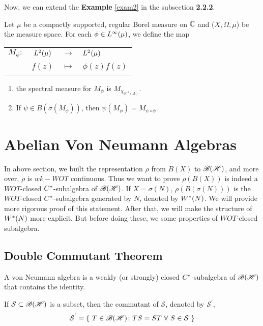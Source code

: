 \documentclass[a4paper,11pt]{report}
\begin{document}
Now, we can extend the \textbf{Example} \ref{exam2} in the subsection \textbf{2.2.2}.

\begin{exam} \label{exam3}
	Let $\mu$ be a compactly supported, regular Borel measure on $\mathbb{C}$ and ($X,\Omega,\mu$) be the measure space. For each $\phi \in L^{\infty}(\mu)$, we define the map
	\begin{center}
		\begin{tabular}{l c c l}
			$M_{\phi} \colon$ & $L^{2}(\mu)$ & $\longrightarrow$ & $L^{2}(\mu)$ \\
			~ & $f(z)$ & $\longmapsto$ & $\phi(z)f(z)$
		\end{tabular} 
	\end{center}
	\begin{enumerate}[label=\arabic*)]
		\item the spectral measure for $M_{\phi}$ is $M_{\chi_{\phi^{-1}(\Delta)}}$.
		\item If $\psi \in B(\sigma(M_{\phi}))$, then $\psi(M_{\phi}) = M_{\psi \circ \phi}$.
	\end{enumerate}
\end{exam}

\section{Abelian Von Neumann Algebras}

In above section, we built the representation $\rho$ from $B(X)$ to $\mathscr{B(H)}$, and more over, $\rho$ is $wk-WOT$ continuous. Thus we want to prove $\rho(B(X))$ is indeed a $WOT$-closed $C^{*}$-subalgebra of $\mathscr{B(H)}$. If $X = \sigma(N)$, $\rho(B(\sigma(N)))$ is the $WOT$-closed $C^{*}$-subalgebra generated by $N$, denoted by $W^{*}(N)$. We will provide more rigorous proof of this statement. After that, we will make the structure of $W^{*}(N)$ more explicit. But before doing these, we some properties of $WOT$-closed subalgebra.

\subsection{Double Commutant Theorem}

\begin{defn}
	A von Neumann algebra is a weakly (or strongly) closed $C^{*}$-subalgebra of $\mathscr{B(H)}$ that contains the identity.
\end{defn}

\begin{defn}
	If $\mathcal{S} \subset \mathscr{B(H)}$ is a subset, then the commutant of $\mathcal{S}$, denoted by $\mathcal{S}^{'}$,
	\begin{equation*}
		\mathcal{S}^{'} = \{~ T\in \mathscr{B(H)} \colon TS=ST~\forall~S \in \mathcal{S} ~\}
	\end{equation*}
\end{defn}
\end{document}
